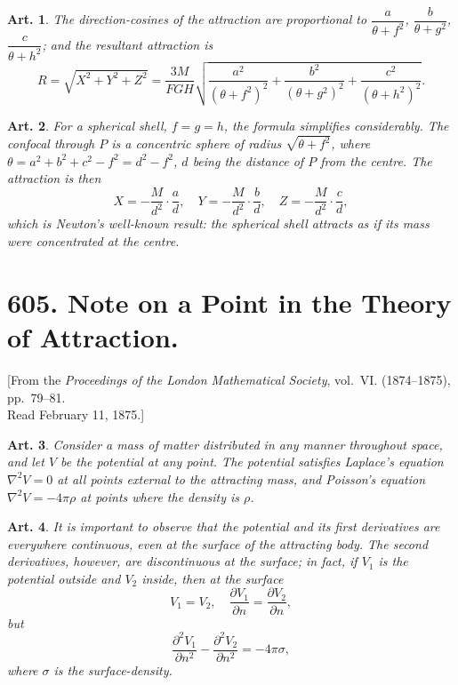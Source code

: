 \documentclass[12pt,a4paper]{article}
\theoremstyle{cayley}
\newtheorem{art}{Art.}[section]
\begin{document}
\begin{art}
The direction-cosines of the attraction are proportional to $\dfrac{a}{\theta+f^2}$, $\dfrac{b}{\theta+g^2}$, $\dfrac{c}{\theta+h^2}$; and the resultant attraction is
\[
R = \sqrt{X^2 + Y^2 + Z^2}
= \frac{3M}{F G H}\sqrt{\frac{a^2}{(\theta+f^2)^2} + \frac{b^2}{(\theta+g^2)^2} + \frac{c^2}{(\theta+h^2)^2}}.
\]
\end{art}

\begin{art}
For a spherical shell, $f=g=h$, the formula simplifies considerably. The confocal through $P$ is a concentric sphere of radius $\sqrt{\theta + f^2}$, where $\theta = a^2 + b^2 + c^2 - f^2 = d^2 - f^2$, $d$ being the distance of $P$ from the centre. The attraction is then
\[
X = -\frac{M}{d^2}\cdot\frac{a}{d},\quad
Y = -\frac{M}{d^2}\cdot\frac{b}{d},\quad
Z = -\frac{M}{d^2}\cdot\frac{c}{d},
\]
which is Newton's well-known result: the spherical shell attracts as if its mass were concentrated at the centre.
\end{art}


\newpage
\section[Note on a Point in the Theory of Attraction]%
{605. Note on a Point in the Theory of Attraction.}

\begin{center}
{\small [From the \textit{Proceedings of the London Mathematical Society}, vol.~VI. (1874--1875), pp.~79--81.\\
Read February 11, 1875.]}
\end{center}

\begin{art}
Consider a mass of matter distributed in any manner throughout space, and let $V$ be the potential at any point. The potential satisfies Laplace's equation $\nabla^2 V = 0$ at all points external to the attracting mass, and Poisson's equation $\nabla^2 V = -4\pi\rho$ at points where the density is $\rho$.
\end{art}

\begin{art}
It is important to observe that the potential and its first derivatives are everywhere continuous, even at the surface of the attracting body. The second derivatives, however, are discontinuous at the surface; in fact, if $V_1$ is the potential outside and $V_2$ inside, then at the surface
\[
V_1 = V_2, \quad \frac{\partial V_1}{\partial n} = \frac{\partial V_2}{\partial n},
\]
but
\[
\frac{\partial^2 V_1}{\partial n^2} - \frac{\partial^2 V_2}{\partial n^2} = -4\pi\sigma,
\]
where $\sigma$ is the surface-density.
\end{art}
\end{document}
